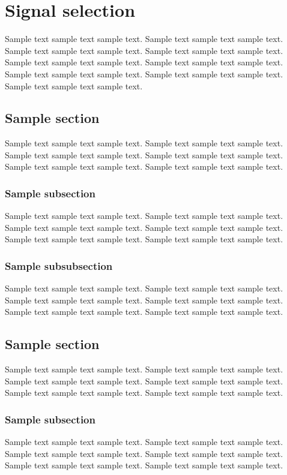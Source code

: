 \chapter{Signal selection}

Sample text sample text sample text. Sample text sample text sample text.
Sample text sample text sample text. Sample text sample text sample text.
Sample text sample text sample text. Sample text sample text sample text.
Sample text sample text sample text. Sample text sample text sample text.
Sample text sample text sample text. \cite{Grosz_and_Sidner_1986}

\section{Sample section}
Sample text sample text sample text. Sample text sample text sample text.
Sample text sample text sample text. Sample text sample text sample text.
Sample text sample text sample text. Sample text sample text sample text.

\subsection{Sample subsection}
Sample text sample text sample text. Sample text sample text sample text.
Sample text sample text sample text. Sample text sample text sample text.
Sample text sample text sample text. Sample text sample text sample text.

\subsection{Sample subsubsection}
Sample text sample text sample text. Sample text sample text sample text.
Sample text sample text sample text. Sample text sample text sample text.
Sample text sample text sample text. Sample text sample text sample text.

\section{Sample section}
Sample text sample text sample text. Sample text sample text sample text.
Sample text sample text sample text. Sample text sample text sample text.
Sample text sample text sample text. Sample text sample text sample text.

\subsection{Sample subsection}
Sample text sample text sample text. Sample text sample text sample text.
Sample text sample text sample text. Sample text sample text sample text.
Sample text sample text sample text. Sample text sample text sample text.
